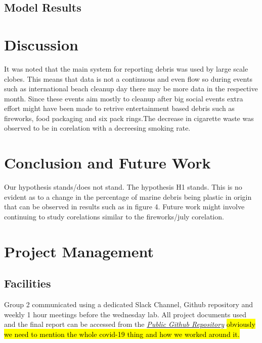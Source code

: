 \documentclass[10pt]{article}\usepackage[]{graphicx}\usepackage[]{color}
\begin{document}
\subsection{Model Results}




\pagebreak
\section{Discussion}

It was noted that the main system for reporting debris was used by large scale clobes. This means that data is not a continuous and even flow so during events such as international beach cleanup day there may be more data in the respective month. Since these events aim mostly to cleanup after big social events extra effort might have been made to retrive entertainment based debris such as fireworks, food packaging and six pack rings.The decrease in cigarette waste was observed to be in corelation with a decreesing smoking rate.


\section{Conclusion and Future Work}\label{cdsmote1}

Our hypothesis stands/does not stand.
The hypothesis H1 stands. This is no evident as to a change in the percentage of marine debris being plastic in origin that can be observed in results such as in figure 4.  
Future work might involve continuing to study corelations similar to the fireworks/july corelation.  







\pagebreak
\section{Project Management}\label{mgt}
\subsection{Facilities}
Group 2 communicated using a dedicated Slack Channel, Github repository and weekly 1 hour meetings before the wednesday lab.
All project documents used and the final report can be accessed from the \textit{\href{https://github.com/KarenJewell/CMM507Group2}{Public Github Repository}}
\hl{obviously we need to mention the whole covid-19 thing and how we worked around it.}
\end{document}
